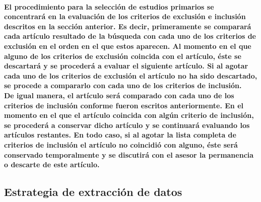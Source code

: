 \documentclass[10pt, twocolumn]{article}
\begin{document}
\paragraph{El procedimiento para la selección de estudios primarios se concentrará en la evaluación de los criterios de exclusión e inclusión descritos en la sección anterior. Es decir, primeramente se comparará cada artículo resultado de la búsqueda con cada uno de los criterios de exclusión en el orden en el que estos aparecen. Al momento en el que alguno de los criterios de exclusión coincida con el artículo, éste se descartará y se procederá a evaluar el siguiente artículo. Si al agotar cada uno de los criterios de exclusión el artículo no ha sido descartado, se procede a compararlo con cada uno de los criterios de inclusión. \\ De igual manera, el artículo será comparado con cada uno de los criterios de inclusión conforme fueron escritos anteriormente. En el momento en el que el artículo coincida con algún criterio de inclusión, se procederá a conservar dicho artículo y se continuará evaluando los artículos restantes. En todo caso, si al agotar la lista completa de criterios de inclusión el artículo no coincidió con alguno, éste será conservado temporalmente y se discutirá con el asesor la permanencia o descarte de este artículo.}

\subsection{Estrategia de extracción de datos}
\end{document}
